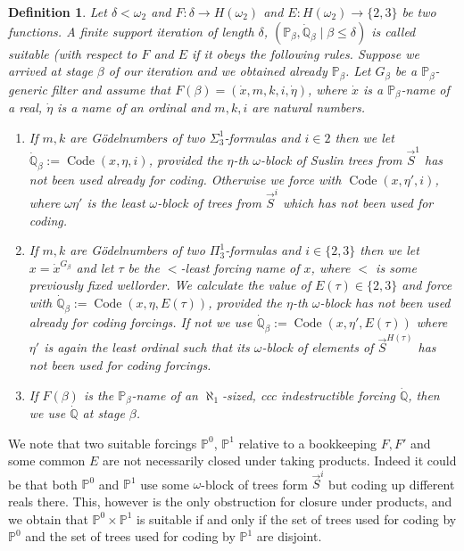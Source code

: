 \documentclass[a4paper,11pt]{article}
\newtheorem{definition}[theorem]{Definition}
\newcommand{\forceP}{\mathbb{P}}
\newcommand{\forceQ}{\mathbb{Q}}
\begin{document}
{\begin{definition}
Let $\delta< \omega_2$ and $F: \delta \rightarrow H(\omega_2)$ and $E: H(\omega_2) \rightarrow \{2,3\}$ be two functions. A finite support iteration of length $\delta$, $(\forceP_{\beta} ,\dot{\forceQ}_{\beta}\mid \beta \le \delta)$ is called suitable (with respect to $F$ and $E$ if it obeys the following rules. Suppose we arrived at stage $\beta$ of our iteration and we obtained already $\forceP_{\beta}$. Let $G_{\beta}$ be a $\forceP_{\beta}$-generic filter and assume that $F(\beta)= (\dot{x},m,k,i, \dot{\eta})$, where $\dot{x}$ is a $\forceP_{\beta}$-name of a real, $\dot{\eta}$ is a name of an ordinal and $m,k,i$ are natural numbers.
\begin{enumerate}
\item If $m,k$ are G\"odelnumbers of two $\Sigma^1_3$-formulas and $i \in 2$ then
we let $\dot{\forceQ}_{\beta}:= \operatorname{Code} (x,\eta,i)$, provided the $\eta$-th $\omega$-block of Suslin trees from $\vec{S}^1$ has not been used already for coding. Otherwise we force with $\operatorname{Code} (x,\eta',i)$, where $\omega \eta'$ is the least $\omega$-block of trees from $\vec{S}^i$ which has not been used for coding.
\item If $m,k$ are G\"odelnumbers of two $\Pi^1_3$-formulas and $i \in \{2,3\}$ then we let $x= \dot{x}^{G_{\beta}}$ and let $\tau$ be the $<$-least forcing name of $x$, where $<$ is some previously fixed wellorder. We calculate the value of $E(\tau) \in \{2,3\}$ and force with $\dot{\forceQ}_{\beta}:= \operatorname{Code} (x, \eta, E(\tau))$, provided the $\eta$-th $\omega$-block has not been used already for coding forcings. If not we use $\dot{\forceQ}_{\beta}:= \operatorname{Code} (x, \eta', E(\tau))$ where $\eta'$ is again the least ordinal such that its $\omega$-block of elements of $\vec{S}^{H(\tau)}$ has not been used for coding forcings.

\item If $F(\beta)$ is the $\forceP_{\beta}$-name of an $\aleph_1$-sized, ccc indestructible forcing $\dot{\forceQ}$, then we use $\dot{\forceQ}$ at stage $\beta$.
\end{enumerate}
\end{definition}

We note that two suitable forcings $\forceP^0$, $\forceP^1$ relative to a bookkeeping $F,F'$ and some common $E$ are not necessarily closed under taking products. Indeed it could be that both $\forceP^0$ and $\forceP^1$ use some $\omega$-block of trees form $\vec{S}^i$ but coding up different reals there. This, however is the only obstruction for closure under products, and we obtain that $\forceP^0 \times \forceP^1$ is suitable if and only if the set of trees used for coding by $\forceP^0$ and the set of trees used for coding by $\forceP^1$ are disjoint.

}
\end{document}
